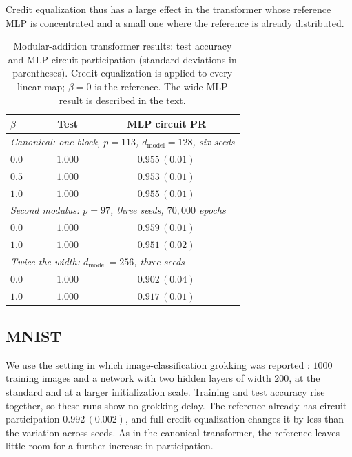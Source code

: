 \documentclass{article} %
\begin{document}
Credit equalization thus has a large effect in the transformer whose reference MLP is concentrated and a small one where the reference is already distributed.

\begin{table}[!ht]
\caption{Modular-addition transformer results: test accuracy and MLP circuit participation (standard deviations in parentheses). Credit equalization is applied to every linear map; $\beta{=}0$ is the reference. The wide-MLP result is described in the text.}
\label{tab:transformer}
\begin{center}
\small
\begin{tabular}{lcc}
\toprule
$\beta$ & Test & MLP circuit PR \\
\midrule
\multicolumn{3}{l}{\emph{Canonical: one block, $p=113$, $d_{\text{model}}=128$, six seeds}} \\
$0.0$ & $1.000$ & $0.955\,(0.01)$ \\
$0.5$ & $1.000$ & $0.953\,(0.01)$ \\
$1.0$ & $1.000$ & $0.955\,(0.01)$ \\
\midrule
\multicolumn{3}{l}{\emph{Second modulus: $p=97$, three seeds, $70{,}000$ epochs}} \\
$0.0$ & $1.000$ & $0.959\,(0.01)$ \\
$1.0$ & $1.000$ & $0.951\,(0.02)$ \\
\midrule
\multicolumn{3}{l}{\emph{Twice the width: $d_{\text{model}}=256$, three seeds}} \\
$0.0$ & $1.000$ & $0.902\,(0.04)$ \\
$1.0$ & $1.000$ & $0.917\,(0.01)$ \\
\bottomrule
\end{tabular}
\end{center}
\end{table}

\subsection{MNIST}
\label{app:mnist}
We use the setting in which image-classification grokking was reported \citep{liu2022omnigrok}: $1000$ training images and a network with two hidden layers of width $200$, at the standard and at a larger initialization scale. Training and test accuracy rise together, so these runs show no grokking delay. The reference already has circuit participation $0.992\,(0.002)$, and full credit equalization changes it by less than the variation across seeds. As in the canonical transformer, the reference leaves little room for a further increase in participation.
\end{document}
